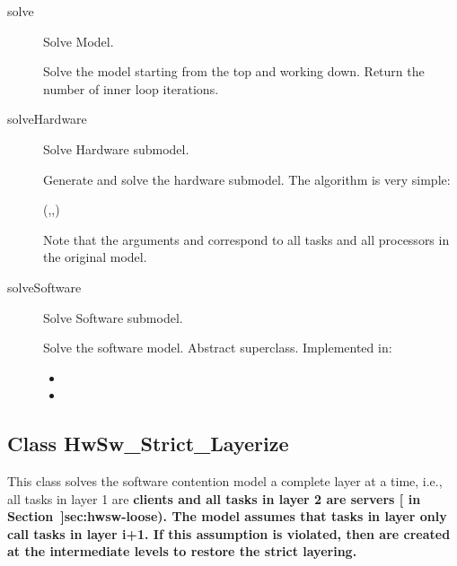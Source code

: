 \begin{description}

\item[solve] \texonly{---} Solve Model.\\

Solve the model starting from the top and working down.  Return the
number of inner loop iterations.

\label{sec:hwsw-solveHardware}
\item[solveHardware] \texonly{---} Solve Hardware submodel.\\

Generate and solve the hardware submodel.  The algorithm is very simple:
\begin{example}
  (,,)
\end{example}

Note that the arguments  and  correspond to
all tasks and all processors in the original model.

\label{sec:hwsw-solveSoftware}
\item[solveSoftware] \texonly{---} Solve Software submodel.\\

Solve the software model.  Abstract superclass.  Implemented in:
\begin{itemize}
\item {}
\item {}
\end{itemize}
\end{description}


\htmlrule
\subsection{Class HwSw\_Strict\_Layerize}
\label{sec:hwsw-strict}

This class solves the software contention model a complete layer at a
time, i.e., all tasks in layer 1  are \bf{clients} and all tasks in
layer 2 are \bf{servers} [ in
Section~\Ref]{sec:hwsw-loose}).  The model assumes that tasks in layer
 only call tasks in layer {i+1}.  If this assumption is
violated, then  are created at the
intermediate levels to restore the strict layering.

